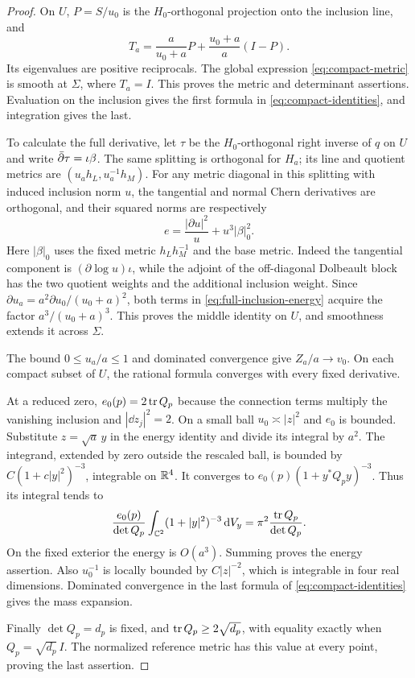 \begin{proof}
On $U$, $P=S/u_0$ is the $H_0$-orthogonal projection onto
the inclusion line, and
\[
 T_a=\frac{a}{u_0+a}P+\frac{u_0+a}{a}(I-P).
\]
Its eigenvalues are positive reciprocals. The global expression
\eqref{eq:compact-metric} is smooth at $\Sigma$, where $T_a=I$.
This proves the metric and determinant assertions. Evaluation
on the inclusion gives the first formula in
\eqref{eq:compact-identities}, and integration gives the last.

To calculate the full derivative, let $\tau$ be the
$H_0$-orthogonal right inverse of $q$ on $U$ and write
$\bar\partial\tau=\iota\beta$. The same splitting is orthogonal for
$H_a$; its line and quotient metrics are
$(u_ah_L,u_a^{-1}h_M)$. For any metric diagonal in this
splitting with induced inclusion norm $u$, the tangential and
normal Chern derivatives are orthogonal, and their squared
norms are respectively
\begin{equation}\label{eq:full-inclusion-energy}
             e=\frac{|\partial u|^2}{u}+u^3|\beta|_0^2 .
\end{equation}
Here $|\beta|_0$ uses the fixed metric $h_Lh_M^{-1}$ and
the base metric. Indeed the tangential component is
$(\partial\log u)\iota$, while the adjoint of the off-diagonal
Dolbeault block has the two quotient weights and the additional
inclusion weight. Since
$\partial u_a=a^2\partial u_0/(u_0+a)^2$, both terms in
\eqref{eq:full-inclusion-energy} acquire the factor
$a^3/(u_0+a)^3$. This proves the middle identity on $U$,
and smoothness extends it across $\Sigma$.

The bound $0\le u_a/a\le1$ and dominated convergence give
$Z_a/a\to v_0$. On each compact subset of $U$, the rational
formula converges with every fixed derivative.

At a reduced zero, $e_0(p)=2\operatorname{tr} Q_p$ because the
connection terms multiply the vanishing inclusion and
$|\dd z_j|^2=2$. On a small ball $u_0\asymp|z|^2$ and
$e_0$ is bounded. Substitute $z=\sqrt a\,y$ in the
energy identity and divide its integral by $a^2$.
The integrand, extended by zero outside the rescaled ball,
is bounded by $C(1+c|y|^2)^{-3}$, integrable on $\mathbb R^4$.
It converges to $e_0(p)(1+y^*Q_py)^{-3}$. Thus its
integral tends to
\[
 \frac{e_0(p)}{\det Q_p}
       \int_{\mathbb C^2}(1+|y|^2)^{-3}\,\mathrm d V_y
                  =\pi^2\frac{\operatorname{tr} Q_p}{\det Q_p}.
\]
On the fixed exterior the energy is $O(a^3)$.
Summing proves the energy assertion. Also $u_0^{-1}$ is
locally bounded by $C|z|^{-2}$, which is integrable in
four real dimensions. Dominated convergence in the last
formula of \eqref{eq:compact-identities} gives the mass
expansion.

Finally $\det Q_p=d_p$ is fixed, and
$\operatorname{tr} Q_p\ge2\sqrt{d_p}$, with equality exactly when
$Q_p=\sqrt{d_p}\,I$. The normalized reference metric has
this value at every point, proving the last assertion.
\end{proof}

